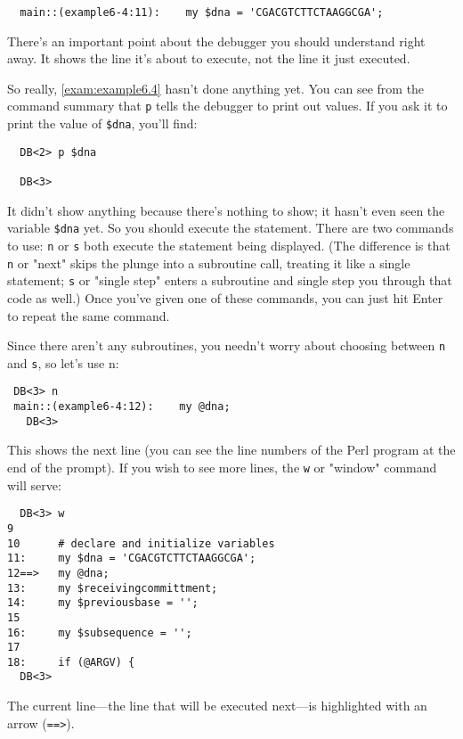 \begin{lstlisting}
  main::(example6-4:11):    my $dna = 'CGACGTCTTCTAAGGCGA';
\end{lstlisting}

There's an important point about the debugger you should understand right away. It shows the line it's about to execute, not the line it just executed.

So really, \autoref{exam:example6.4} hasn't done anything yet. You can see from the command summary that \verb|p| tells the debugger to print out values. If you ask it to print the value of \verb|$dna|, you'll find:

\begin{lstlisting}
  DB<2> p $dna

  DB<3> 
\end{lstlisting}

It didn't show anything because there's nothing to show; it hasn't even seen the variable \verb|$dna| yet. So you should execute the statement. There are two commands to use: \verb|n| or \verb|s| both execute the statement being displayed. (The difference is that \verb|n| or "next" skips the plunge into a subroutine call, treating it like a single statement; \verb|s| or "single step" enters a subroutine and single step you through that code as well.) Once you've given one of these commands, you can just hit Enter to repeat the same command.

Since there aren't any subroutines, you needn't worry about choosing between \verb|n| and \verb|s|, so let's use n: 

\begin{lstlisting}
 DB<3> n
 main::(example6-4:12):    my @dna;
   DB<3> 
\end{lstlisting}

This shows the next line (you can see the line numbers of the Perl program at the end of the prompt). If you wish to see more lines, the \verb|w| or "window" command will serve: 

\begin{lstlisting}
  DB<3> w
9
10      # declare and initialize variables
11:     my $dna = 'CGACGTCTTCTAAGGCGA';
12==>   my @dna;
13:     my $receivingcommittment;
14:     my $previousbase = ''; 
15
16:     my $subsequence = '';
17
18:     if (@ARGV) {
  DB<3>
\end{lstlisting}

The current line—the line that will be executed next—is highlighted with an arrow (\verb|==>|).

